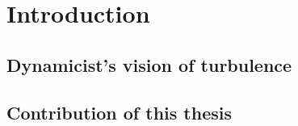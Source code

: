 \begin{preliminary}

    \ifpaper               %
    \begin{dedication}
        
    \end{dedication}
    \fi

%        

    \begin{acknowledgements}
        
    \end{acknowledgements}

    \contents

    \begin{summary}
        
    \end{summary}

\end{preliminary}


\ifboyscout \pagestyle{headings} \fi  %

\chapter{Introduction}
%

    \section{Dynamicist's vision of turbulence}
    \label{s:hopf}
    

    \section{Contribution of this thesis}
    \label{s:thesisIntro}
	
